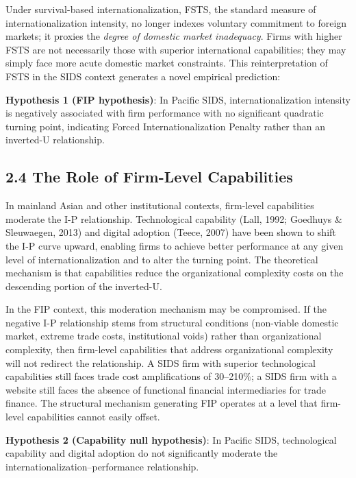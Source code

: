 \documentclass[
  12pt]{article}
\begin{document}
Under survival-based internationalization, FSTS, the standard measure of
internationalization intensity, no longer indexes voluntary commitment
to foreign markets; it proxies the \emph{degree of domestic market
inadequacy}. Firms with higher FSTS are not necessarily those with
superior international capabilities; they may simply face more acute
domestic market constraints. This reinterpretation of FSTS in the SIDS
context generates a novel empirical prediction:

\textbf{Hypothesis 1 (FIP hypothesis)}: In Pacific SIDS,
internationalization intensity is negatively associated with firm
performance with no significant quadratic turning point, indicating
Forced Internationalization Penalty rather than an inverted-U
relationship.

\hypertarget{the-role-of-firm-level-capabilities}{%
\subsection{2.4 The Role of Firm-Level
Capabilities}\label{the-role-of-firm-level-capabilities}}

In mainland Asian and other institutional contexts, firm-level
capabilities moderate the I-P relationship. Technological capability
(Lall, 1992; Goedhuys \& Sleuwaegen, 2013) and digital adoption (Teece,
2007) have been shown to shift the I-P curve upward, enabling firms to
achieve better performance at any given level of internationalization
and to alter the turning point. The theoretical mechanism is that
capabilities reduce the organizational complexity costs on the
descending portion of the inverted-U.

In the FIP context, this moderation mechanism may be compromised. If the
negative I-P relationship stems from structural conditions (non-viable
domestic market, extreme trade costs, institutional voids) rather than
organizational complexity, then firm-level capabilities that address
organizational complexity will not redirect the relationship. A SIDS
firm with superior technological capabilities still faces trade cost
amplifications of 30--210\%; a SIDS firm with a website still faces the
absence of functional financial intermediaries for trade finance. The
structural mechanism generating FIP operates at a level that firm-level
capabilities cannot easily offset.

\textbf{Hypothesis 2 (Capability null hypothesis)}: In Pacific SIDS,
technological capability and digital adoption do not significantly
moderate the internationalization--performance relationship.
\end{document}
